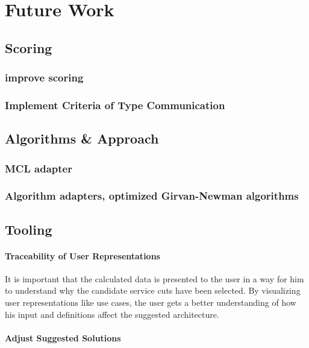 \chapter{Future Work}
\label{cha:futureWork}

\section{Scoring}

\subsection{improve scoring}

\subsection{Implement Criteria of Type Communication}


\section{Algorithms \& Approach}


\subsection{MCL adapter}
\label{subsec:mclAdapter}

\subsection{Algorithm adapters, optimized Girvan-Newman algorithms}


\section{Tooling}


\subsubsection{Traceability of User Representations}

It is important that the calculated data is presented to the user in a way for him to understand why the candidate service cuts have been selected. By visualizing user representations like use cases, the user gets a better understanding of how his input and definitions affect the suggested architecture. 

\subsubsection{Adjust Suggested Solutions}

